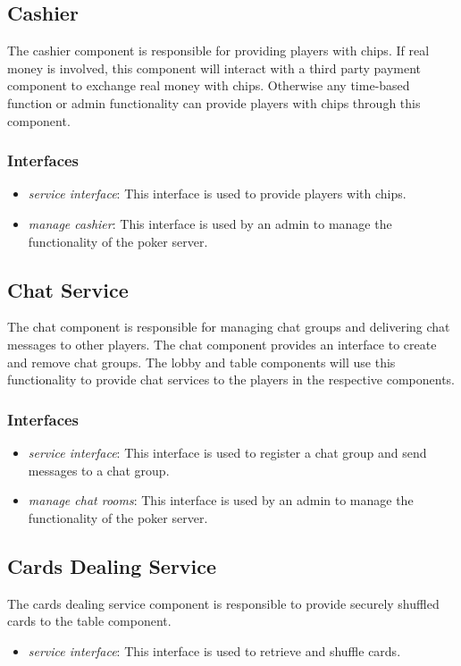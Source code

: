 \documentclass[a4paper,11pt]{report}
\begin{document}
\subsection{Cashier}
The cashier component is responsible for providing players with chips. If real money is involved, this component will interact with a third party payment component to exchange real money with chips. Otherwise any time-based function or admin functionality can provide players with chips through this component.
\subsubsection{Interfaces}
\begin{itemize}
\item \emph{service interface}: This interface is used to provide players with chips. 
\item \emph{manage cashier}: This interface is used by an admin to manage the functionality of the poker server.
\end{itemize}

\subsection{Chat Service}
The chat component is responsible for managing chat groups and delivering chat messages to other players. The chat component provides an interface to create and remove chat groups. The lobby and table components will use this functionality to provide chat services to the players in the respective components.
\subsubsection{Interfaces}
\begin{itemize}
\item \emph{service interface}: This interface is used to register a chat group and send messages to a chat group.
\item \emph{manage chat rooms}: This interface is used by an admin to manage the functionality of the poker server.
\end{itemize}

\subsection{Cards Dealing Service}
The cards dealing service component is responsible to provide securely shuffled cards to the table component.
\begin{itemize}
\item \emph{service interface}: This interface is used to retrieve and shuffle cards.
\end{itemize}
\end{document}
